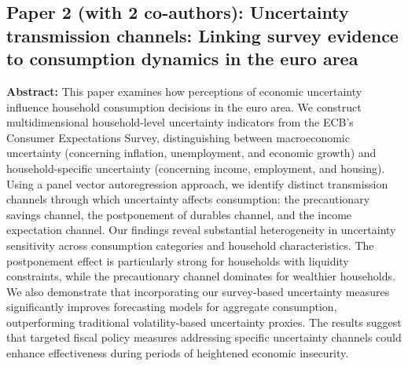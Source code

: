 \documentclass[11pt,a4paper]{article}
\begin{document}
\subsection*{Paper 2 (with 2 co-authors): Uncertainty transmission channels: Linking survey evidence to consumption dynamics in the euro area}
\textbf{Abstract:} This paper examines how perceptions of economic uncertainty influence household consumption decisions in the euro area. We construct multidimensional household-level uncertainty indicators from the ECB's Consumer Expectations Survey, distinguishing between macroeconomic uncertainty (concerning inflation, unemployment, and economic growth) and household-specific uncertainty (concerning income, employment, and housing). Using a panel vector autoregression approach, we identify distinct transmission channels through which uncertainty affects consumption: the precautionary savings channel, the postponement of durables channel, and the income expectation channel. Our findings reveal substantial heterogeneity in uncertainty sensitivity across consumption categories and household characteristics. The postponement effect is particularly strong for households with liquidity constraints, while the precautionary channel dominates for wealthier households. We also demonstrate that incorporating our survey-based uncertainty measures significantly improves forecasting models for aggregate consumption, outperforming traditional volatility-based uncertainty proxies. The results suggest that targeted fiscal policy measures addressing specific uncertainty channels could enhance effectiveness during periods of heightened economic insecurity.
\end{document}

